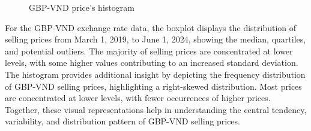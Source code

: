 \documentclass{ieeeojies}
\begin{document}
\begin{figure}[H]
\begin{minipage}{0.23\textwidth}
    \caption{GBP-VND price's histogram}
    \label{fig:2}
    \end{minipage}
\end{figure}
\justify
For the GBP-VND exchange rate data, the boxplot displays the distribution of selling prices from March 1, 2019, to June 1, 2024, showing the median, quartiles, and potential outliers. The majority of selling prices are concentrated at lower levels, with some higher values contributing to an increased standard deviation. The histogram provides additional insight by depicting the frequency distribution of GBP-VND selling prices, highlighting a right-skewed distribution. Most prices are concentrated at lower levels, with fewer occurrences of higher prices. Together, these visual representations help in understanding the central tendency, variability, and distribution pattern of GBP-VND selling prices.
\end{document}
